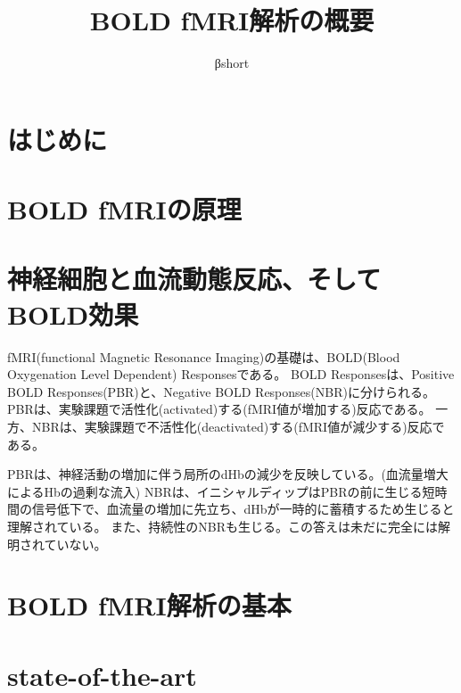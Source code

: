 \documentclass[uplatex, a4j, twocolumn]{jsarticle}
\title{BOLD fMRI解析の概要}
\author{βshort}
\begin{document}

\section{はじめに}


\section{BOLD fMRIの原理}


\section{神経細胞と血流動態反応、そしてBOLD効果}
fMRI(functional Magnetic Resonance Imaging)の基礎は、BOLD(Blood Oxygenation Level Dependent) Responsesである。
BOLD Responsesは、Positive BOLD Responses(PBR)と、Negative BOLD Responses(NBR)に分けられる。
PBRは、実験課題で活性化(activated)する(fMRI値が増加する)反応である。
一方、NBRは、実験課題で不活性化(deactivated)する(fMRI値が減少する)反応である。

PBRは、神経活動の増加に伴う局所のdHbの減少を反映している。(血流量増大によるHbの過剰な流入)
NBRは、イニシャルディップはPBRの前に生じる短時間の信号低下で、血流量の増加に先立ち、dHbが一時的に蓄積するため生じると理解されている。
また、持続性のNBRも生じる。この答えは未だに完全には解明されていない。

\section{BOLD fMRI解析の基本}

\section{state-of-the-art}
\end{document}
